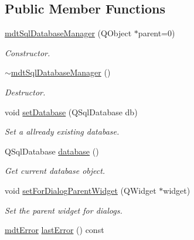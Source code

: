 \subsection*{Public Member Functions}
\begin{DoxyCompactItemize}
\item 
\hypertarget{classmdt_sql_database_manager_a8a9b487981f99ddc5d476776e5e0bb06}{
\hyperlink{classmdt_sql_database_manager_a8a9b487981f99ddc5d476776e5e0bb06}{mdtSqlDatabaseManager} (QObject $\ast$parent=0)}
\label{classmdt_sql_database_manager_a8a9b487981f99ddc5d476776e5e0bb06}

\begin{DoxyCompactList}\small\item\em Constructor. \end{DoxyCompactList}\item 
\hypertarget{classmdt_sql_database_manager_affd97fb8d28d07617e860d748ff57c5f}{
\hyperlink{classmdt_sql_database_manager_affd97fb8d28d07617e860d748ff57c5f}{$\sim$mdtSqlDatabaseManager} ()}
\label{classmdt_sql_database_manager_affd97fb8d28d07617e860d748ff57c5f}

\begin{DoxyCompactList}\small\item\em Destructor. \end{DoxyCompactList}\item 
\hypertarget{classmdt_sql_database_manager_a6c6f2b1a7754193e3a9b80069c8df747}{
void \hyperlink{classmdt_sql_database_manager_a6c6f2b1a7754193e3a9b80069c8df747}{setDatabase} (QSqlDatabase db)}
\label{classmdt_sql_database_manager_a6c6f2b1a7754193e3a9b80069c8df747}

\begin{DoxyCompactList}\small\item\em Set a allready existing database. \end{DoxyCompactList}\item 
\hypertarget{classmdt_sql_database_manager_a54755f29b7cd87746e34a107e60241c5}{
QSqlDatabase \hyperlink{classmdt_sql_database_manager_a54755f29b7cd87746e34a107e60241c5}{database} ()}
\label{classmdt_sql_database_manager_a54755f29b7cd87746e34a107e60241c5}

\begin{DoxyCompactList}\small\item\em Get current database object. \end{DoxyCompactList}\item 
void \hyperlink{classmdt_sql_database_manager_a3da56635b2a4db98b768e5846e15fa83}{setForDialogParentWidget} (QWidget $\ast$widget)
\begin{DoxyCompactList}\small\item\em Set the parent widget for dialogs. \end{DoxyCompactList}\item 
\hypertarget{classmdt_sql_database_manager_a7fb8458fb9fc10216c8dfbbeb2c3dc50}{
\hyperlink{classmdt_error}{mdtError} \hyperlink{classmdt_sql_database_manager_a7fb8458fb9fc10216c8dfbbeb2c3dc50}{lastError} () const }
\label{classmdt_sql_database_manager_a7fb8458fb9fc10216c8dfbbeb2c3dc50}


\end{DoxyCompactItemize}

